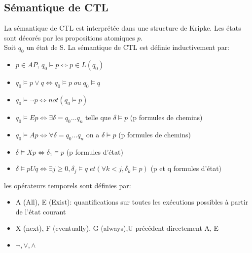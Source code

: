 \subsection{Sémantique de CTL}
La sémantique de CTL est interprétée dans une structure de Kripke. Les états sont décorés par les propositions atomiques ${\displaystyle p}$.\\
Soit $q_0$ un état de S. La sémantique de CTL est définie inductivement par:
\begin{itemize}
	\item  $p \in AP$, $q_0 \models p \Leftrightarrow p \in L(q_0 )$
	\item $q_0 \models p\vee q \Leftrightarrow q_0 \models p\; ou\; q_0 \models q$
	\item $q_0 \models \neg p \Leftrightarrow not(q_0 \models p)$
	\item  $q_0 \models Ep \Leftrightarrow  \exists \delta =q_0 …q_n$ telle que $\delta \models p$ (p formules de chemins)
	\item $q_0 \models Ap \Leftrightarrow \forall \delta =q_0 …q_n$ on a $\delta \models p$ (p formules de chemins)
	\item$ \delta \models Xp \Leftrightarrow \delta _1 \models p$ (p formules d'état)
	\item $ \delta \models pUq \Leftrightarrow \exists j \geq 0, \delta _j \models q\; et (\forall k <j, \delta _k \models p)$ (p et q formules d'état)
\end{itemize}
les opérateurs temporels sont définies par:
\begin{itemize}
	\item A (All), E (Exist): quantifications sur toutes les exécutions possibles à partir de l'état courant
	\item X (next), F (eventually), G (always),U précédent directement  A, E
	\item $\neg , \vee, \wedge$
\end{itemize}

